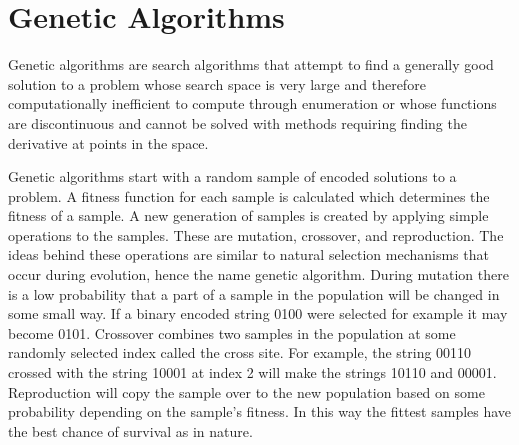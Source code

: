 \section{Genetic Algorithms}
Genetic algorithms are search algorithms that attempt to find a generally good solution to a problem whose search space
is very large and therefore computationally inefficient to compute through enumeration or whose functions are discontinuous and cannot
be solved with methods requiring finding the derivative at points in the space. 

Genetic algorithms start with a random sample of encoded solutions to a problem. A fitness function for each sample is calculated which determines the fitness of a sample. A new generation of samples is created by applying simple operations to the samples. These are mutation, crossover, and reproduction. The ideas behind these operations are similar to natural selection mechanisms that occur during evolution, hence the name genetic algorithm. During mutation there is a low probability that a part of a sample in the population will be changed in some small way. If a binary encoded string 0100 were selected for example it may become 0101. Crossover combines two samples in the population at some randomly selected index called the cross site. For example, the string 00110 crossed with the string 10001 at index 2 will make the strings 10110 and 00001. Reproduction will copy the sample over to the new population based on some probability depending on the sample's fitness. In this way the fittest samples have the best chance of survival as in nature. 
